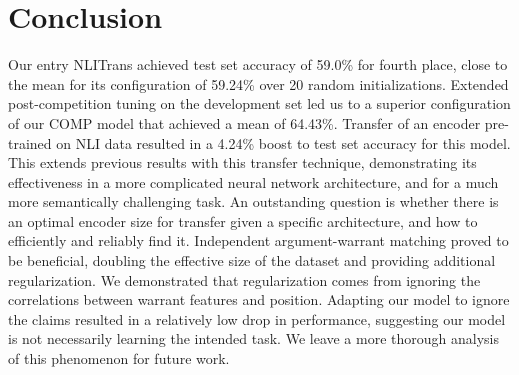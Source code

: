 \documentclass[11pt,a4paper]{article}
\begin{document}
\section{Conclusion}

Our entry NLITrans achieved test set accuracy of 59.0\% for fourth place,
  close to the mean for its configuration of 59.24\% over 20 random initializations.
Extended post-competition tuning on the development set 
  led us to a superior configuration of our COMP model 
  that achieved a mean of 64.43\%.
Transfer of an encoder pre-trained on NLI data resulted in a 4.24\% boost to test set accuracy for this model.
This extends previous results with this transfer technique,
  demonstrating its effectiveness 
  in a more complicated neural network architecture,
  and for a much more semantically challenging task.
An outstanding question is whether there is an optimal encoder size for transfer 
  given a specific architecture, 
  and how to efficiently and reliably find it.
Independent argument-warrant matching proved to be beneficial,
  doubling the effective size of the dataset and providing additional regularization.
We demonstrated that regularization comes from ignoring the correlations between warrant features and position.
Adapting our model to ignore the claims 
  resulted in a relatively low drop in performance,
  suggesting our model is not necessarily learning the intended task.
We leave a more thorough analysis of this phenomenon for future work.



\end{document}
